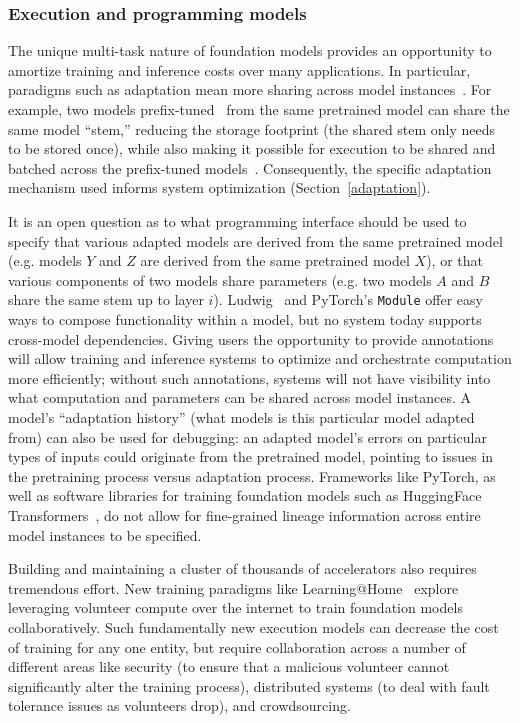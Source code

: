 \subsubsection{Execution and programming models}

The unique multi-task nature of foundation models provides an opportunity to amortize training and inference costs over many applications. In particular, paradigms such as adaptation mean more sharing across model instances~\citep{a_call_to_build_models}. For example, two models prefix-tuned~\citep{li2021prefix} from the same pretrained model can share the same model ``stem,'' reducing the storage footprint (the shared stem only needs to be stored once), while also making it possible for execution to be shared and batched across the prefix-tuned models~\citep{shen2019nexus, narayanan2018accelerating}. Consequently, the specific adaptation mechanism used informs system optimization (Section~\ref{adaptation}).

It is an open question as to what programming interface should be used to specify that various adapted models are derived from the same pretrained model (e.g. models $Y$ and $Z$ are derived from the same pretrained model $X$), or that various components of two models share parameters (e.g. two models $A$ and $B$ share the same stem up to layer $i$). Ludwig~\citep{molino2019ludwig} and PyTorch's \texttt{Module} offer easy ways to compose functionality within a model, but no system today supports cross-model dependencies. Giving users the opportunity to provide annotations will allow training and inference systems to optimize and orchestrate computation more efficiently; without such annotations, systems will not have visibility into what computation and parameters can be shared across model instances. A model's ``adaptation history'' (what models is this particular model adapted from) can also be used for debugging: an adapted model's errors on particular types of inputs could originate from the pretrained model, pointing to issues in the pretraining process versus adaptation process. Frameworks like PyTorch, as well as software libraries for training foundation models such as HuggingFace Transformers~\citep{wolf2020transformers}, do not allow for fine-grained lineage information across entire model instances to be specified.

Building and maintaining a cluster of thousands of accelerators also requires tremendous effort. New training paradigms like Learning@Home~\citep{Ryabinin2020Learninghome, Diskin2021collab} explore leveraging volunteer compute over the internet to train foundation models collaboratively. Such fundamentally new execution models can decrease the cost of training for any one entity, but require collaboration across a number of different areas like security (to ensure that a malicious volunteer cannot significantly alter the training process), distributed systems (to deal with fault tolerance issues as volunteers drop), and crowdsourcing.

